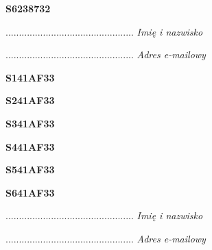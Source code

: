 \begin{turn}{90}\huge \textbf{S6238732}\end{turn}

\begin{turn}{90}\begin{minipage}{\linewidth} \vspace{20mm} ................................................  \textit{Imię i nazwisko}\end{minipage}\end{turn}

\begin{turn}{90}\begin{minipage}{\linewidth} \vspace{20mm} ................................................  \textit{Adres e-mailowy}\end{minipage}\end{turn}

\begin{turn}{90}\huge \textbf{S141AF33}\end{turn}

\begin{turn}{90}\huge \textbf{S241AF33}\end{turn}

\begin{turn}{90}\huge \textbf{S341AF33}\end{turn}

\begin{turn}{90}\huge \textbf{S441AF33}\end{turn}

\begin{turn}{90}\huge \textbf{S541AF33}\end{turn}

\begin{turn}{90}\huge \textbf{S641AF33}\end{turn}

\begin{turn}{90}\begin{minipage}{\linewidth} \vspace{20mm} ................................................  \textit{Imię i nazwisko}\end{minipage}\end{turn}

\begin{turn}{90}\begin{minipage}{\linewidth} \vspace{20mm} ................................................  \textit{Adres e-mailowy}\end{minipage}\end{turn}

